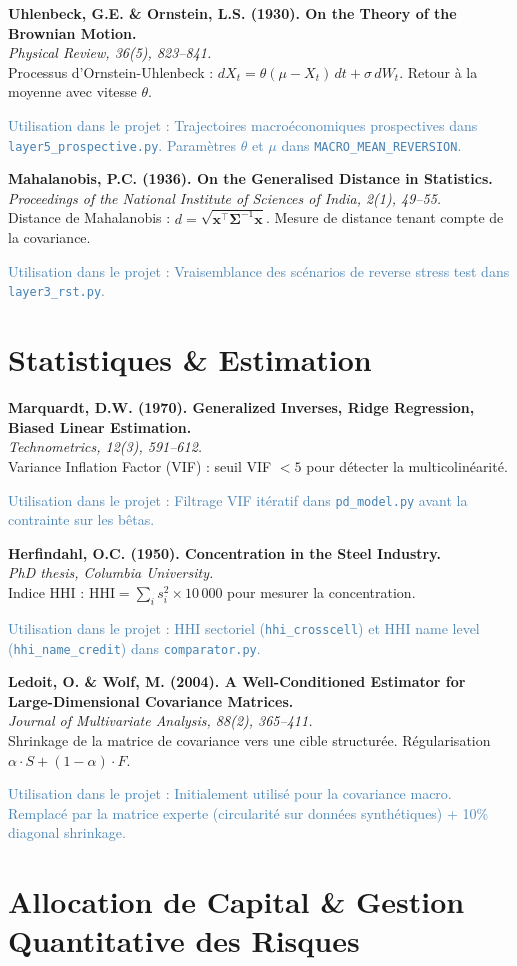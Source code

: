 \documentclass[12pt,a4paper]{article}
\newcommand{\bibentry}[4]{%
  \noindent\textbf{#1}\\
  \textit{#2}\\
  #3\par
  \textcolor{steelblue}{\footnotesize\textsf{Utilisation dans le projet :} #4}\par
  \medskip
}
\begin{document}
\bibentry{Uhlenbeck, G.E. \& Ornstein, L.S. (1930). On the Theory of the Brownian Motion.}{\emph{Physical Review}, 36(5), 823--841.}{Processus d'Ornstein-Uhlenbeck : $dX_t = \theta(\mu - X_t)\,dt + \sigma\,dW_t$. Retour à la moyenne avec vitesse $\theta$.}{Trajectoires macroéconomiques prospectives dans \texttt{layer5\_prospective.py}. Paramètres $\theta$ et $\mu$ dans \texttt{MACRO\_MEAN\_REVERSION}.}

\bibentry{Mahalanobis, P.C. (1936). On the Generalised Distance in Statistics.}{\emph{Proceedings of the National Institute of Sciences of India}, 2(1), 49--55.}{Distance de Mahalanobis : $d = \sqrt{\mathbf{x}^\top \boldsymbol{\Sigma}^{-1} \mathbf{x}}$. Mesure de distance tenant compte de la covariance.}{Vraisemblance des scénarios de reverse stress test dans \texttt{layer3\_rst.py}.}

\section{Statistiques \& Estimation}

\bibentry{Marquardt, D.W. (1970). Generalized Inverses, Ridge Regression, Biased Linear Estimation.}{\emph{Technometrics}, 12(3), 591--612.}{Variance Inflation Factor (VIF) : seuil VIF $< 5$ pour détecter la multicolinéarité.}{Filtrage VIF itératif dans \texttt{pd\_model.py} avant la contrainte sur les bêtas.}

\bibentry{Herfindahl, O.C. (1950). Concentration in the Steel Industry.}{PhD thesis, Columbia University.}{Indice HHI : $\text{HHI} = \sum_i s_i^2 \times 10\,000$ pour mesurer la concentration.}{HHI sectoriel (\texttt{hhi\_crosscell}) et HHI name level (\texttt{hhi\_name\_credit}) dans \texttt{comparator.py}.}

\bibentry{Ledoit, O. \& Wolf, M. (2004). A Well-Conditioned Estimator for Large-Dimensional Covariance Matrices.}{\emph{Journal of Multivariate Analysis}, 88(2), 365--411.}{Shrinkage de la matrice de covariance vers une cible structurée. Régularisation $\alpha \cdot S + (1-\alpha) \cdot F$.}{Initialement utilisé pour la covariance macro. Remplacé par la matrice experte (circularité sur données synthétiques) + 10\% diagonal shrinkage.}

\section{Allocation de Capital \& Gestion Quantitative des Risques}
\end{document}
